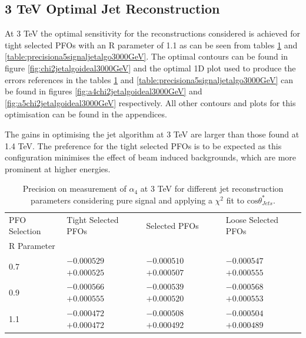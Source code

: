 \subsection{3 TeV Optimal Jet Reconstruction}
At 3 TeV the optimal sensitivity for the reconstructions considered is achieved for tight selected PFOs with an R parameter of 1.1 as can be seen from tables \ref{table:precisiona4signaljetalgo3000GeV} and \ref{table:precisiona5signaljetalgo3000GeV}.  The optimal contours can be found in figure \ref{fig:chi2jetalgoideal3000GeV} and the optimal 1D plot used to produce the errors references in the tables \ref{table:precisiona4signaljetalgo3000GeV} and \ref{table:precisiona5signaljetalgo3000GeV} can be found in figures \ref{fig:a4chi2jetalgoideal3000GeV} and \ref{fig:a5chi2jetalgoideal3000GeV} respectively.  All other contours and plots for this optimisation can be found in the appendices.  

The gains in optimising the jet algorithm at 3 TeV are larger than those found at 1.4 TeV.  The preference for the tight selected PFOs is to be expected as this configuration minimises the effect of beam induced backgrounds, which are more prominent at higher energies.  

\begin{table}[h!]
\centering
\begin{tabular}{l l l l}
\hline
PFO Selection & Tight Selected PFOs & Selected PFOs & Loose Selected PFOs \\ 
R Parameter & & & \\ 
\hline
0.7 & $-0.000529$ $+0.000525$ & $-0.000510$ $+0.000507$ & $-0.000547$ $+0.000555$ \\
0.9 & $-0.000566$ $+0.000555$ & $-0.000539$ $+0.000520$ & $-0.000568$ $+0.000553$ \\
1.1 & $-0.000472$ $+0.000472$ & $-0.000508$ $+0.000492$ & $-0.000504$ $+0.000489$ \\
\hline
\end{tabular}
\caption[$1\sigma$ precision on measurement of $\alpha_{4}$ for different jet reconstruction parameters considering pure signal at 3 TeV.]{Precision on measurement of $\alpha_{4}$ at 3 TeV for different jet reconstruction parameters considering pure signal and applying a $\chi^{2}$ fit to $\text{cos}\theta^{*}_{Jets}$.}
\label{table:precisiona4signaljetalgo3000GeV}
\end{table}

